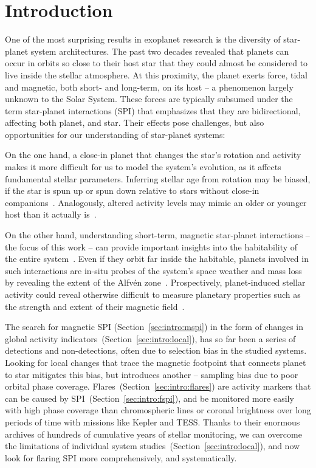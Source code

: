 \documentclass[twocolumn]{aastex631}
\begin{document}
\section{Introduction}
\label{sec:intro}
One of the most surprising results in exoplanet research is the diversity of star-planet system architectures. The past two decades revealed that planets can occur in orbits so close to their host star that they could almost be considered to live inside the stellar atmosphere. At this proximity, the planet exerts force, tidal and magnetic, both short- and long-term, on its host -- a phenomenon largely unknown to the Solar System. These forces are typically subsumed under the term star-planet interactions (SPI) that emphasizes that they are bidirectional, affecting both planet, and star. Their effects pose challenges, but also opportunities for our understanding of star-planet systems:

On the one hand, a close-in planet that changes the star's rotation and activity makes it more difficult for us to model the system's evolution, as it affects fundamental stellar parameters. Inferring stellar age from rotation may be biased, if the star is spun up or spun down relative to stars without close-in companions~\citep{tejadaarevalo2021further, brown2014discrepancies, maxted2015comparison}. Analogously, altered activity levels may mimic an older or younger host than it actually is~\citep{ilic2022tidal}. 

On the other hand, understanding short-term, magnetic star-planet interactions -- the focus of this work -- can provide important insights into the habitability of the entire system~\citep{shkolnik2018signatures}. Even if they orbit far inside the habitable, planets involved in such interactions are in-situ probes of the system's space weather and mass loss by revealing the extent of the Alfv\'en zone~\citep{kavanagh2021planetinduced, chebly2022destination}. Prospectively, planet-induced stellar activity could reveal otherwise difficult to measure planetary properties such as the strength and extent of their magnetic field~\citep{cauley2019magnetic}. 

The search for magnetic SPI (Section~\ref{sec:intro:mspi}) in the form of changes in global activity indicators~(Section~\ref{sec:intro:local}), has so far been a series of detections and non-detections, often due to selection bias in the studied systems. Looking for local changes that trace the magnetic footpoint that connects planet to star mitigates this bias, but introduces another -- sampling bias due to poor orbital phase coverage. Flares~(Section~\ref{sec:intro:flares}) are activity markers that can be caused by SPI~(Section~\ref{sec:intro:fspi}), and be monitored more easily with high phase coverage than chromospheric lines or coronal brightness over long periods of time with missions like Kepler and TESS. Thanks to their enormous archives of hundreds of cumulative years of stellar monitoring, we can overcome the limitations of individual system studies~(Section~\ref{sec:intro:local}), and now look for flaring SPI more comprehensively, and systematically.
\end{document}
